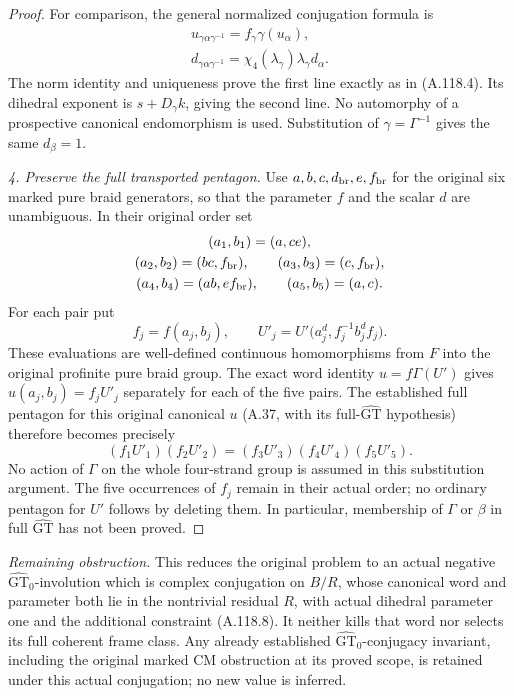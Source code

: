 \begin{proof}
For comparison, the general normalized conjugation formula is
\[
 \begin{gathered}
 u_{\gamma\alpha\gamma^{-1}}=f_\gamma\gamma(u_\alpha),\\
 d_{\gamma\alpha\gamma^{-1}}
 =\chi_4(\lambda_\gamma)\lambda_\gamma d_\alpha.
 \end{gathered}                                                   \tag{A.118.6}
\]
The norm identity and uniqueness prove the first line exactly as
in (A.118.4). Its dihedral exponent is
\(s+D_\gamma k\), giving the second line. No automorphy of a
prospective canonical endomorphism is used. Substitution of
\(\gamma=\Gamma^{-1}\) gives the same \(d_\beta=1\).

\medskip\noindent\emph{4. Preserve the full transported pentagon.}
Use \(a,b,c,d_{\rm br},e,f_{\rm br}\) for the original six marked
pure braid generators, so that the parameter \(f\) and the scalar
\(d\) are unambiguous. In their original order set
\[
 \begin{gathered}
 (a_1,b_1)=(a,ce),\\
 (a_2,b_2)=(bc,f_{\rm br}),\qquad
 (a_3,b_3)=(c,f_{\rm br}),\\
 (a_4,b_4)=(ab,ef_{\rm br}),\qquad
 (a_5,b_5)=(a,c).
 \end{gathered}
\]
For each pair put
\[
 f_j=f(a_j,b_j),\qquad
 U'_j=U'\bigl(a_j^d,f_j^{-1}b_j^df_j\bigr).                 \tag{A.118.7}
\]
These evaluations are well-defined continuous homomorphisms from
\(F\) into the original profinite pure braid group. The exact word
identity \(u=f\Gamma(U')\) gives
\(u(a_j,b_j)=f_jU'_j\) separately for each of the five pairs.
The established full pentagon for this original canonical \(u\)
(A.37, with its full-\(\widehat{\mathrm{GT}}\) hypothesis) therefore
becomes precisely
\[
 \boxed{(f_1U'_1)(f_2U'_2)
       =(f_3U'_3)(f_4U'_4)(f_5U'_5).}                       \tag{A.118.8}
\]
No action of \(\Gamma\) on the whole four-strand group is assumed
in this substitution argument. The five occurrences of \(f_j\)
remain in their actual order; no ordinary pentagon for \(U'\) follows
by deleting them. In particular, membership of \(\Gamma\) or
\(\beta\) in full \(\widehat{\mathrm{GT}}\) has not been proved.
\end{proof}
\noindent\emph{Remaining obstruction.}
This reduces the original problem to an actual negative
\(\widehat{\mathrm{GT}}_0\)-involution which is complex conjugation
on \(B/R\), whose canonical word and parameter both lie in the
nontrivial residual \(R\), with actual dihedral parameter one and
the additional constraint (A.118.8). It neither kills that word nor
selects its full coherent frame class. Any already established
\(\widehat{\mathrm{GT}}_0\)-conjugacy invariant, including the original
marked CM obstruction at its proved scope, is retained under this
actual conjugation; no new value is inferred.
